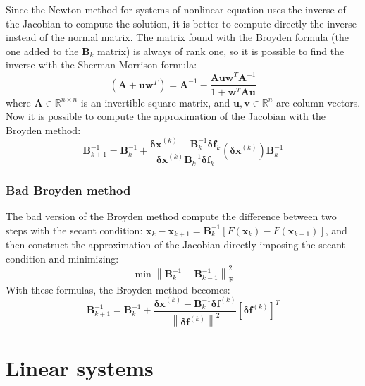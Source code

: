 \documentclass[12pt, a4paper]{report}
\newtheorem[style=M,bodystyle=\normalfont]{theorem}{Theorem}
\newtheorem[style=M,bodystyle=\normalfont]{proposition}{Proposition}
\newtheorem[style=M,bodystyle=\normalfont]{corollary}{Corollary}
\newtheorem[style=M,bodystyle=\normalfont]{lemma}{Lemma}
\newtheorem[style=M,bodystyle=\normalfont]{definition}{Definition}
\begin{document}
    Since the Newton method for systems of nonlinear equation uses the inverse of the Jacobian to compute the solution, it is better to compute directly the inverse instead of the
    normal matrix. The matrix found with the Broyden formula (the one added to the $\boldsymbol{B}_k$ matrix) is always of rank one, so it is possible to find the inverse with the 
    Sherman-Morrison formula: 
    \[\left( \boldsymbol{A}+\boldsymbol{uw}^{T} \right) = \boldsymbol{A}^{-1}-\dfrac{\boldsymbol{Auw}^T\boldsymbol{A}^{-1}}{1+\boldsymbol{w}^T\boldsymbol{Au}}\]
    where $\boldsymbol{A} \in \mathbb{R}^{n \times n}$ is an invertible square matrix, and $\boldsymbol{u},\boldsymbol{v} \in \mathbb{R}^{n}$ are column vectors. Now it is possible to compute 
    the approximation of the Jacobian with the Broyden method: 
    \[\boldsymbol{B}_{k+1}^{-1}=\boldsymbol{B}_{k}^{-1}+\dfrac{\boldsymbol{\delta x}^{(k)}-\boldsymbol{B}_k^{-1}\boldsymbol{\delta f}_k}{\boldsymbol{\delta x}^{(k)}\boldsymbol{B}_k^{-1}\boldsymbol{\delta f}_k}\left( \boldsymbol{\delta x}^{(k)} \right)\boldsymbol{B}_k^{-1}\]

    \subsection{Bad Broyden method}
    The bad version of the Broyden method compute the difference between two steps with the secant condition: $\boldsymbol{x}_k-\boldsymbol{x}_{k+1}=\boldsymbol{B}_k^{-1}\left[ F(\boldsymbol{x}_k)-F(\boldsymbol{x}_{k-1}) \right]$, and then construct the approximation of the Jacobian directly imposing the secant condition and minimizing: 
    \[\min{\left\lVert \boldsymbol{B}_k^{-1}-\boldsymbol{B}_{k-1}^{-1} \right\rVert_{\boldsymbol{F}}^{2}}\]
    With these formulas, the Broyden method becomes: 
    \[\boldsymbol{B}_{k+1}^{-1}=\boldsymbol{B}_{k}^{-1}+\dfrac{\boldsymbol{\delta x}^{(k)}-\boldsymbol{B}_k^{-1}\boldsymbol{\delta f}^{(k)}}{{\left\lVert \boldsymbol{\delta f}^{(k)} \right\rVert}^2}\left[ \boldsymbol{\delta f}^{(k)} \right]^T\]

\newpage

\chapter{Linear systems}
\end{document}
